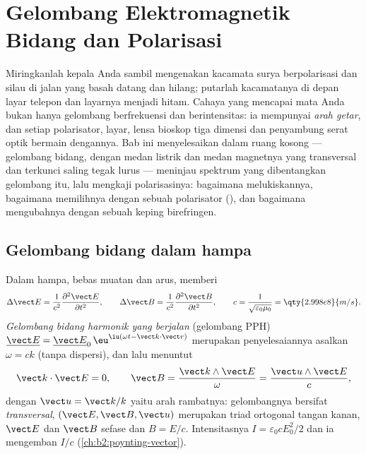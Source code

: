 \chapter{Gelombang Elektromagnetik Bidang dan Polarisasi}\label{ch:b2:plane-waves-polarization}

Miringkanlah kepala Anda sambil mengenakan kacamata surya berpolarisasi dan
silau di jalan yang basah datang dan hilang; putarlah kacamatanya di depan
layar telepon dan layarnya menjadi hitam. Cahaya yang mencapai mata Anda
bukan hanya gelombang berfrekuensi dan berintensitas: ia mempunyai
\emph{arah getar}, dan setiap polarisator, layar, lensa bioskop tiga
dimensi dan penyambung serat optik bermain dengannya. Bab ini menyelesaikan
 dalam ruang kosong --- gelombang bidang, dengan medan
listrik dan medan magnetnya yang transversal dan terkunci saling tegak lurus
--- meninjau spektrum yang dibentangkan gelombang itu, lalu mengkaji
polarisasinya: bagaimana melukiskannya, bagaimana memilihnya dengan sebuah
polarisator (), dan bagaimana mengubahnya dengan sebuah keping
birefringen.

\section{Gelombang bidang dalam hampa}

\begin{theorem}\label{thm:b2:plane-waves-polarization:wave}
Dalam hampa, bebas muatan dan arus,  memberi
\[
\Delta\vect E = \frac1{c^2}\frac{\partial^2\vect E}{\partial t^2} , \qquad
\Delta\vect B = \frac1{c^2}\frac{\partial^2\vect B}{\partial t^2} , \qquad
c = \frac1{\sqrt{\varepsilon_0\mu_0}} = \qty{2.998e8}{m/s} .
\]
\emph{Gelombang bidang harmonik yang berjalan} (gelombang PPH) $\underline{\vect E} =
\underline{\vect E}_0\,\eu^{\iu(\omega t - \vect k\cdot\vect r)}$ merupakan penyelesaiannya asalkan
$\omega = ck$ (tanpa dispersi), dan  lalu menuntut
\[
\vect k\cdot\vect E = 0 , \qquad
\vect B = \frac{\vect k\wedge\vect E}\omega = \frac{\vect u\wedge\vect E}c ,
\]
dengan $\vect u = \vect k/k$ yaitu arah rambatnya: gelombangnya bersifat
\emph{transversal}, $(\vect E, \vect B, \vect u)$ merupakan triad ortogonal
tangan kanan, $\vect E$ dan $\vect B$ sefase dan $B = E/c$. Intensitasnya
$I = \varepsilon_0cE_0^2/2$ dan ia mengemban  $I/c$
(\cref{ch:b2:poynting-vector}).
\end{theorem}

